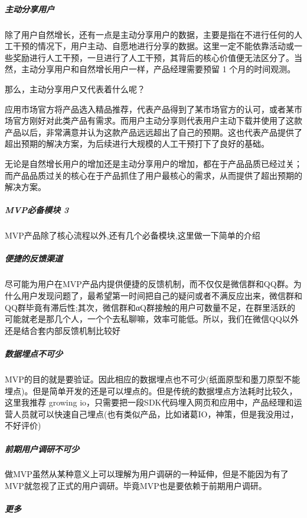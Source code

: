 \documentclass[letterpaper,11pt,english]{sphinxmanual}
\begin{document}
\subparagraph{主动分享用户}
\label{\detokenize{chapter_knowledge/MVP:id3}}
除了用户自然增长，还有一点是主动分享用户的数据，主要是指在不进行任何的人工干预的情况下，用户主动、自愿地进行分享的数据。这里一定不能依靠活动或一些奖励进行人工干预，一旦进行了人工干预，其背后的核心价值便无法区分了。当然，主动分享用户和自然增长用户一样，产品经理需要预留
1 个月的时间观测。

那么，主动分享用户又代表着什么呢？

应用市场官方将产品选入精品推荐，代表产品得到了某市场官方的认可，或者某市场官方刚好对此类产品有需求。而用户主动分享则代表用户主动下载并使用了这款产品以后，非常满意并认为这款产品远远超出了自己的预期。这也代表产品提供了超出预期的解决方案，为后续进行大规模的人工干预打下了良好的基础。

无论是自然增长用户的增加还是主动分享用户的增加，都在于产品品质已经过关；而产品品质过关的核心在于产品抓住了用户最核心的需求，从而提供了超出预期的解决方案。


\subparagraph{MVP必备模块 3\sphinxfootnotemark[549]}
\label{\detokenize{chapter_knowledge/MVP:mvp-3}}%
\begin{footnotetext}[549]\sphinxAtStartFootnote
{}
%
\end{footnotetext}\ignorespaces 
MVP产品除了核心流程以外,还有几个必备模块,这里做一下简单的介绍


\subparagraph{便捷的反馈渠道}
\label{\detokenize{chapter_knowledge/MVP:id4}}
尽可能为用户在MVP产品内提供便捷的反馈机制，而不仅仅是微信群和QQ群。为什么用户发现问题了，最希望第一时间把自己的疑问或者不满反应出来，微信群和QQ群毕竟有滞后性;其次，微信群和αQ群接触的用户可数量不足，在群里活跃的可能就老是那几个人，一个个去私聊嘛，效率可能低。所以，我们在微信QQ以外还是结合套内部反馈机制比较好


\subparagraph{数据埋点不可少}
\label{\detokenize{chapter_knowledge/MVP:id5}}
MVP的目的就是要验证。因此相应的数据埋点也不可少(纸面原型和墨刀原型不能埋点)。但是简单开发的还是可以埋点的。但是传统的数据埋点方法耗时比较久，这里我推荐
growing
io，只需要把一段SDK代码埋入网页和应用中，产品经理和运营人员就可以快速自己埋点(也有类似产品，比如诸葛IO，神策，但是我没用过，不好评价)


\subparagraph{前期用户调研不可少}
\label{\detokenize{chapter_knowledge/MVP:id6}}
做MVP虽然从某种意义上可以理解为用户调硏的一种延伸，但是不能因为有了MVP就忽视了正式的用户调研。毕竟MVP也是要依赖于前期用户调研。


\subparagraph{更多}
\label{\detokenize{chapter_knowledge/MVP:id7}}
\end{document}
